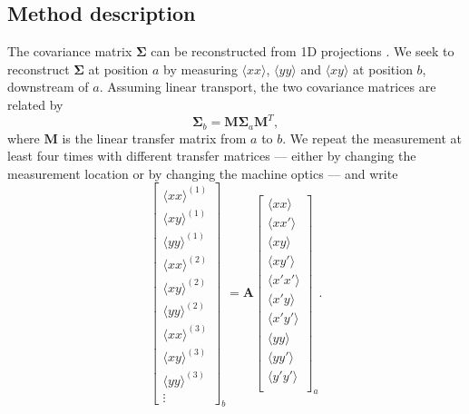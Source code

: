 \subsection{Method description}

The covariance matrix $\bm{\Sigma}$ can be reconstructed from 1D projections \cite{book:Minty2003, Woodley2000, Prat2014}. We seek to reconstruct $\bm{\Sigma}$ at position $a$ by measuring $\langle{xx}\rangle$, $\langle{yy}\rangle$ and $\langle{xy}\rangle$ at position $b$, downstream of $a$. Assuming linear transport, the two covariance matrices are related by
%
\begin{equation}
    \bm{\Sigma}_b = \mathbf{M} \bm{\Sigma}_a \mathbf{M}^T,
\end{equation}
%
where $\mathbf{M}$ is the linear transfer matrix from $a$ to $b$. We repeat the measurement at least four times with different transfer matrices — either by changing the measurement location or by changing the machine optics — and write
%
\begin{equation}
    \begin{bmatrix}
        {\langle{xx}\rangle}^{(1)} \\
        {\langle{xy}\rangle}^{(1)} \\
        {\langle{yy}\rangle}^{(1)} \\
        {\langle{xx}\rangle}^{(2)} \\
        {\langle{xy}\rangle}^{(2)} \\
        {\langle{yy}\rangle}^{(2)} \\
        {\langle{xx}\rangle}^{(3)} \\
        {\langle{xy}\rangle}^{(3)} \\
        {\langle{yy}\rangle}^{(3)} \\
        \vdots
    \end{bmatrix}_b
    = \mathbf{A}
    \begin{bmatrix}
        \langle{xx}\rangle \\
        \langle{xx'}\rangle \\
        \langle{xy}\rangle \\
        \langle{xy'}\rangle \\
        \langle{x'x'}\rangle \\
        \langle{x'y}\rangle \\
        \langle{x'y'}\rangle \\
        \langle{yy}\rangle \\
        \langle{yy'}\rangle \\
        \langle{y'y'}\rangle \\
    \end{bmatrix}_a
    .
\end{equation}
